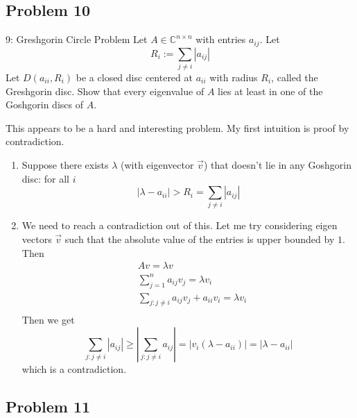 \documentclass[../main]{subfiles}
\begin{document}
\subsection{Problem 10}

\begin{bbox}{9: Greshgorin Circle Problem}
    Let $A\in \mathbb C^{n\times n}$ with entries $a_{ij}$. Let \[
    R_i := \sum_{j\neq i} |a_{ij}|
    \]
    Let $D(a_{ii}, R_i)$ be a closed disc centered at $a_{ii}$ with radius $R_{i}$, called the Greshgorin disc. Show that every eigenvalue of $A$ lies at least in one of the Goshgorin discs of $A$.
    \end{bbox}
    \begin{solution}
        This appears to be a hard and interesting problem. My first intuition is proof by contradiction.
        \begin{enumerate}
            \item Suppose there exists $\lambda$ (with eigenvector $\vec v$) that doesn't lie in any Goshgorin disc: for all $i$
            \[
            |\lambda - a_{ii}| > R_i = \sum_{j\ne i} |a_{ij}|
            \]
            \item We need to reach a contradiction out of this. Let me try considering eigen vectors $\vec v$ such that the absolute value of the entries is upper bounded by $1$. Then 
            \begin{align*}
                &A v = \lambda v \\
                &\sum_{j=1}^n a_{ij}v_j=\lambda v_i\\
                &\sum_{j:j\ne i}a_{ij}v_j + a_{ii}v_i  = \lambda v_i\\
            \end{align*}
            Then we get 
            \[
            \sum_{j:j\neq i}|a_{ij}| \ge |\sum_{j:j\ne i}a_{ij}| = |v_i(\lambda-a_{ii})| = |\lambda-a_{ii}|
            \]
            which is a contradiction.
        \end{enumerate}
    \end{solution}

\subsection{Problem 11}
\end{document}
